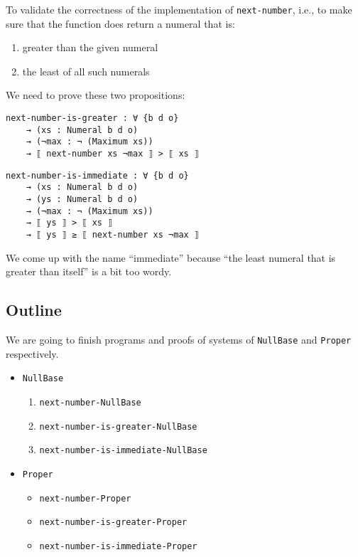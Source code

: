\documentclass[\main/thesis.tex]{subfiles}
\begin{document}
To validate the correctness of the implementation of {\lstinline|next-number|},
i.e., to make sure that the function does return a numeral that is:

\begin{enumerate}
    \item greater than the given numeral
    \item the least of all such numerals
\end{enumerate}

We need to prove these two propositions:

\begin{lstlisting}
next-number-is-greater : ∀ {b d o}
    → (xs : Numeral b d o)
    → (¬max : ¬ (Maximum xs))
    → ⟦ next-number xs ¬max ⟧ > ⟦ xs ⟧
\end{lstlisting}

\begin{lstlisting}
next-number-is-immediate : ∀ {b d o}
    → (xs : Numeral b d o)
    → (ys : Numeral b d o)
    → (¬max : ¬ (Maximum xs))
    → ⟦ ys ⟧ > ⟦ xs ⟧
    → ⟦ ys ⟧ ≥ ⟦ next-number xs ¬max ⟧
\end{lstlisting}

We come up with the name ``immediate''
because ``the least numeral that is greater than itself'' is a bit too wordy.

\subsection{Outline}

We are going to finish programs and proofs of systems of {\lstinline|NullBase|}
and {\lstinline|Proper|} respectively.

\begin{itemize}
    \item {\lstinline|NullBase|}
        \begin{enumerate}
            \item {\lstinline|next-number-NullBase|}
            \item {\lstinline|next-number-is-greater-NullBase|}
            \item {\lstinline|next-number-is-immediate-NullBase|}
        \end{enumerate}
    \item {\lstinline|Proper|}
        \begin{itemize}
            \item {\lstinline|next-number-Proper|}
            \item {\lstinline|next-number-is-greater-Proper|}
            \item {\lstinline|next-number-is-immediate-Proper|}
        \end{itemize}
\end{itemize}
\end{document}
